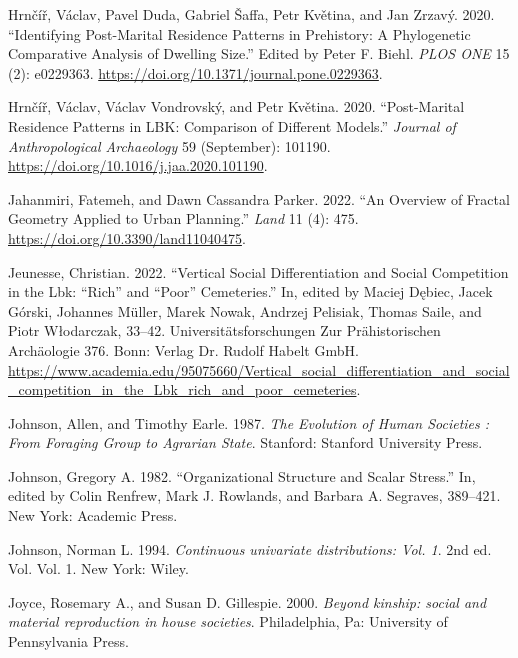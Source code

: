\documentclass[
  12pt,
  a4paper, twoside]{book}
\newlength{\cslhangindent}
\newlength{\cslentryspacingunit} %
\newenvironment{CSLReferences}[2] %
 {%
  \setlength{\parindent}{0pt}
  \ifodd #1
  \let\oldpar\par
  \def\par{\hangindent=\cslhangindent\oldpar}
  \fi
  \setlength{\parskip}{#2\cslentryspacingunit}
 }%
 {}
\begin{document}
\begin{CSLReferences}{1}{0}
\leavevmode{}%
Hrnčíř, Václav, Pavel Duda, Gabriel Šaffa, Petr Květina, and Jan Zrzavý. 2020. {``Identifying Post-Marital Residence Patterns in Prehistory: A Phylogenetic Comparative Analysis of Dwelling Size.''} Edited by Peter F. Biehl. \emph{PLOS ONE} 15 (2): e0229363. \url{https://doi.org/10.1371/journal.pone.0229363}.

\leavevmode{}%
Hrnčíř, Václav, Václav Vondrovský, and Petr Květina. 2020. {``Post-Marital Residence Patterns in LBK: Comparison of Different Models.''} \emph{Journal of Anthropological Archaeology} 59 (September): 101190. \url{https://doi.org/10.1016/j.jaa.2020.101190}.

\leavevmode{}%
Jahanmiri, Fatemeh, and Dawn Cassandra Parker. 2022. {``An Overview of Fractal Geometry Applied to Urban Planning.''} \emph{Land} 11 (4): 475. \url{https://doi.org/10.3390/land11040475}.

\leavevmode{}%
Jeunesse, Christian. 2022. {``Vertical Social Differentiation and Social Competition in the Lbk: {``}Rich{''} and {``}Poor{''} Cemeteries.''} In, edited by Maciej Dębiec, Jacek Górski, Johannes Müller, Marek Nowak, Andrzej Pelisiak, Thomas Saile, and Piotr Włodarczak, 33--42. Universitätsforschungen Zur Prähistorischen Archäologie 376. Bonn: Verlag Dr. Rudolf Habelt GmbH. \url{https://www.academia.edu/95075660/Vertical_social_differentiation_and_social_competition_in_the_Lbk_rich_and_poor_cemeteries}.

\leavevmode{}%
Johnson, Allen, and Timothy Earle. 1987. \emph{The Evolution of Human Societies : From Foraging Group to Agrarian State}. Stanford: Stanford University Press.

\leavevmode{}%
Johnson, Gregory A. 1982. {``Organizational Structure and Scalar Stress.''} In, edited by Colin Renfrew, Mark J. Rowlands, and Barbara A. Segraves, 389--421. New York: Academic Press.

\leavevmode{}%
Johnson, Norman L. 1994. \emph{Continuous univariate distributions: Vol. 1}. 2nd ed. Vol. Vol. 1. New York: Wiley.

\leavevmode{}%
Joyce, Rosemary A., and Susan D. Gillespie. 2000. \emph{Beyond kinship: social and material reproduction in house societies}. Philadelphia, Pa: University of Pennsylvania Press.


\end{CSLReferences}
\end{document}
